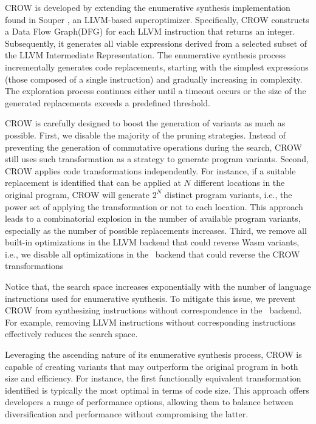 CROW is developed by extending the enumerative synthesis implementation found in Souper \cite{Sasnauskas2017Souper:Superoptimizer}, an LLVM-based superoptimizer. 
Specifically, CROW constructs a Data Flow Graph(DFG) for each LLVM instruction that returns an integer. 
Subsequently, it generates all viable expressions derived from a selected subset of the LLVM Intermediate Representation.
The enumerative synthesis process incrementally generates code replacements, starting with the simplest expressions (those composed of a single instruction) and gradually increasing in complexity. 
The exploration process continues either until a timeout occurs or the size of the generated replacements exceeds a predefined threshold.


CROW is carefully designed to boost the generation of variants as much as possible.
First, we disable the majority of the pruning strategies.
Instead of preventing the generation of commutative operations during the search, CROW still uses such transformation as a strategy to generate program variants. 
Second, CROW applies code transformations independently. 
For instance, if a suitable replacement is identified that can be applied at $N$ different locations in the original program, CROW will generate $2^N$ distinct program variants, i.e., the power set of applying the transformation or not to each location. 
This approach leads to a combinatorial explosion in the number of available program variants, especially as the number of possible replacements increases.
Third, we remove all built-in optimizations in the LLVM backend that could reverse Wasm variants, i.e., we disable all optimizations in the \wasm\ backend that could reverse the CROW transformations

Notice that, the search space increases exponentially with the number of language instructions used for enumerative synthesis. 
To mitigate this issue, we prevent CROW from synthesizing instructions without correspondence in the \wasm\ backend.
For example, removing LLVM instructions without corresponding \Wasm instructions effectively reduces the search space.

Leveraging the ascending nature of its enumerative synthesis process, CROW is capable of creating variants that may outperform the original program in both size and efficiency. 
For instance, the first functionally equivalent transformation identified is typically the most optimal in terms of code size. 
This approach offers developers a range of performance options, allowing them to balance between diversification and performance without compromising the latter.

